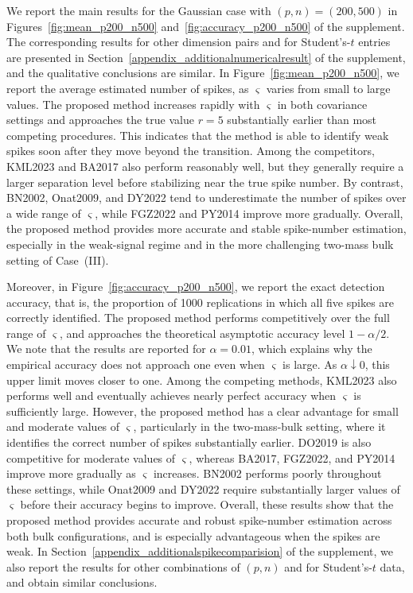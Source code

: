 \documentclass[12pt]{article}
\theoremstyle{plain}
\numberwithin{equation}{section}
\begin{document}
We report the main results for the Gaussian case with $(p,n)=(200,500)$ in Figures~\ref{fig:mean_p200_n500} and~\ref{fig:accuracy_p200_n500} of the supplement. The corresponding results for other dimension pairs and for Student's-$t$ entries are presented in Section~\ref{appendix_additionalnumericalresult} of the supplement, and the qualitative conclusions are similar. In Figure~\ref{fig:mean_p200_n500}, we report the average estimated number of spikes, as $\varsigma$ varies from small to large values. The proposed method increases rapidly with $\varsigma$ in both covariance settings and approaches the true value $r=5$ substantially earlier than most competing procedures. This indicates that the method is able to identify weak spikes soon after they move beyond the transition. Among the competitors, KML2023 and BA2017 also perform reasonably well, but they generally require a larger separation level before stabilizing near the true spike number. By contrast, BN2002, Onat2009, and DY2022 tend to underestimate the number of spikes over a wide range of $\varsigma$, while FGZ2022 and PY2014 improve more gradually. Overall, the proposed method provides more accurate and stable spike-number estimation, especially in the weak-signal regime and in the more challenging two-mass bulk setting of Case~(III).

Moreover, in Figure~\ref{fig:accuracy_p200_n500}, we report the exact detection accuracy, that is, the proportion of 1000 replications in which all five spikes are correctly identified. The proposed method performs competitively over the full range of $\varsigma$, and approaches the theoretical asymptotic accuracy level $1-\alpha/2$. We note that the results are reported for $\alpha=0.01$, which explains why the empirical accuracy does not approach one even when $\varsigma$ is large. As $\alpha \downarrow 0$, this upper limit moves closer to one. Among the competing methods, KML2023 also performs well and eventually achieves nearly perfect accuracy when $\varsigma$ is sufficiently large. However, the proposed method has a clear advantage for small and moderate values of $\varsigma$, particularly in the two-mass-bulk setting, where it identifies the correct number of spikes substantially earlier. DO2019 is also competitive for moderate values of $\varsigma$, whereas BA2017, FGZ2022, and PY2014 improve more gradually as $\varsigma$ increases. BN2002 performs poorly throughout these settings, while Onat2009 and DY2022 require substantially larger values of $\varsigma$ before their accuracy begins to improve. Overall, these results show that the proposed method provides accurate and robust spike-number estimation across both bulk configurations, and is especially advantageous when the spikes are weak. In Section~\ref{appendix_additionalspikecomparision} of the supplement, we also report the results for other combinations of $(p,n)$ and for Student's-$t$ data, and obtain similar conclusions.
\end{document}
